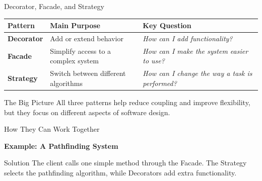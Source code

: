 \documentclass[aspectratio=169]{beamer}
\begin{document}
\begin{frame}{Decorator, Facade, and Strategy}

\begin{center}
\begin{tabular}{|p{2.8cm}|p{3.5cm}|p{3.5cm}|}
\hline
\textbf{Pattern} & \textbf{Main Purpose} & \textbf{Key Question} \\
\hline

\textbf{Decorator}
&
Add or extend behavior
&
\textit{How can I add functionality?}
\\
\hline

\textbf{Facade}
&
Simplify access to a complex system
&
\textit{How can I make the system easier to use?}
\\
\hline

\textbf{Strategy}
&
Switch between different algorithms
&
\textit{How can I change the way a task is performed?}
\\
\hline

\end{tabular}
\end{center}

\vspace{0.6cm}

\begin{block}{The Big Picture}
    All three patterns help reduce coupling and improve flexibility,
    but they focus on different aspects of software design.
\end{block}

\end{frame}


\begin{frame}{How They Can Work Together}

\begin{center}
    \Large
    \textbf{Example: A Pathfinding System}
\end{center}

\begin{block}{Solution}
    The client calls one simple method through the Facade.
    The Strategy selects the pathfinding algorithm,
    while Decorators add extra functionality.
\end{block}

\end{frame}
\end{document}
